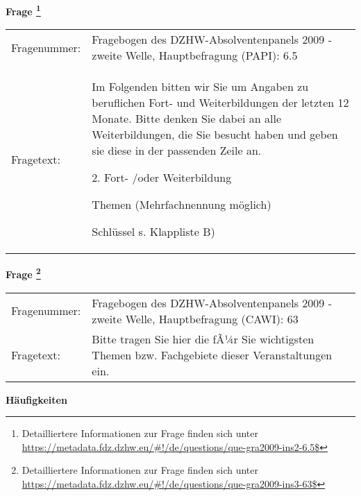 				\vspace*{0.5cm}
                \noindent\textbf{Frage
	                \footnote{Detailliertere Informationen zur Frage finden sich unter
		              \url{https://metadata.fdz.dzhw.eu/\#!/de/questions/que-gra2009-ins2-6.5$}}}\\
				\begin{tabularx}{\hsize}{@{}lX}
					Fragenummer: &
					  Fragebogen des DZHW-Absolventenpanels 2009 - zweite Welle, Hauptbefragung (PAPI):
					  6.5
 \\
					Fragetext: & Im Folgenden bitten wir Sie um Angaben zu beruflichen Fort- und Weiterbildungen der letzten 12 Monate. Bitte denken Sie dabei an alle Weiterbildungen, die Sie besucht haben und geben sie diese in der passenden Zeile an.\par  2. Fort- /oder Weiterbildung\par  Themen (Mehrfachnennung möglich)\par  Schlüssel s. Klappliste B) \\
				\end{tabularx}
				\vspace*{0.5cm}
                \noindent\textbf{Frage
	                \footnote{Detailliertere Informationen zur Frage finden sich unter
		              \url{https://metadata.fdz.dzhw.eu/\#!/de/questions/que-gra2009-ins3-63$}}}\\
				\begin{tabularx}{\hsize}{@{}lX}
					Fragenummer: &
					  Fragebogen des DZHW-Absolventenpanels 2009 - zweite Welle, Hauptbefragung (CAWI):
					  63
 \\
					Fragetext: & Bitte tragen Sie hier die fÃ¼r Sie wichtigsten Themen bzw. Fachgebiete dieser Veranstaltungen ein. \\
				\end{tabularx}





        		\vspace*{0.5cm}
                \noindent\textbf{Häufigkeiten}

